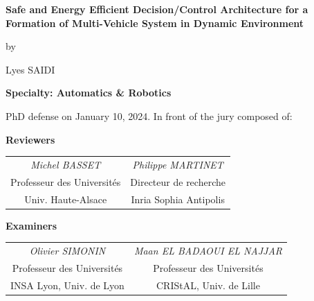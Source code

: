 \thispagestyle{empty}             %

\begin{titlingpage}
    \begin{center}
        \vspace*{1cm}
        \textbf{\LARGE Safe and Energy Efficient Decision/Control Architecture for a Formation of Multi-Vehicle 
        System in Dynamic Environment}

        
        \vspace{0.3cm}
        {\normalsize by}

        
        \vspace{0.3cm}
        {\large Lyes SAIDI}

        \vspace{0.5cm}
        {\large \textbf{Specialty: Automatics \& Robotics}}

        \vspace{0.5cm}
        {\large PhD defense on January 10, 2024. In front of the jury composed of:}
        \vspace{0.2cm}

        \hline
        \vspace{0.2cm}

       \textbf{Reviewers}
        \vspace{0.2cm}

\begin{tabular}{c c}
     \textit{Michel BASSET}      & \textit{Philippe MARTINET} \\
     Professeur des Universités   & Directeur de recherche \\
     Univ. Haute-Alsace           & Inria Sophia Antipolis
\end{tabular}
        \vspace{0.5cm}

       \textbf{Examiners}
        \vspace{0.2cm}

\begin{tabular}{c c}
     \textit{ Olivier SIMONIN}          & \textit{Maan EL BADAOUI EL NAJJAR}  \\
     Professeur des Universités        & Professeur des Universités          \\
     INSA Lyon, Univ. de Lyon          & CRIStAL, Univ. de Lille                     
\end{tabular}

        \vspace{0.2cm}


\end{center}
\end{titlingpage}
